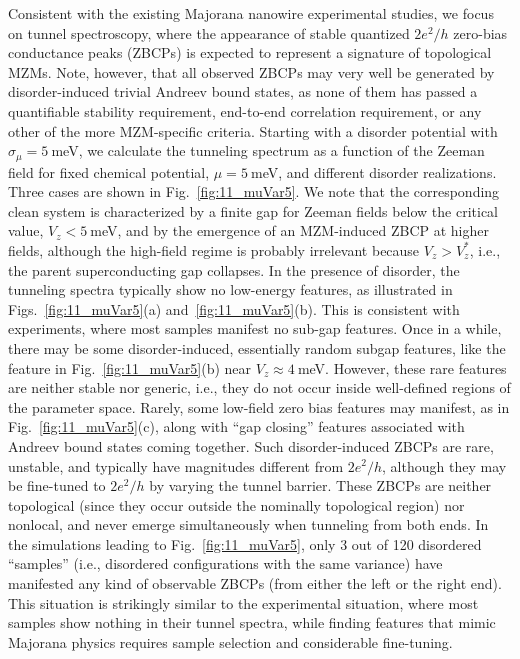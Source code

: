 \documentclass[aps,prmaterials,twocolumn,superscriptaddress,longbibliography]{revtex4-2}
\begin{document}
Consistent with the existing Majorana nanowire experimental studies, we focus on tunnel spectroscopy, where the appearance of stable quantized $ 2e^2/h $ zero-bias conductance peaks (ZBCPs) is expected to represent a signature of topological MZMs. Note, however, that all observed ZBCPs may very well be generated by disorder-induced trivial Andreev bound states, as none of them has passed a quantifiable stability requirement, end-to-end correlation requirement, or any other of the more MZM-specific criteria. 
Starting with a disorder potential with $\sigma_\mu = 5~$meV, we calculate the tunneling spectrum as a function of the Zeeman field for fixed chemical potential, $\mu=5~$meV, and different disorder realizations. Three cases are shown in Fig.~\ref{fig:11_muVar5}. We note that the corresponding clean system is characterized by a finite gap for Zeeman fields below the critical value, $V_z < 5~$meV, and by the emergence of an MZM-induced ZBCP at higher fields, although the high-field regime is probably irrelevant because $V_z > V_z^*$, i.e., the parent superconducting gap collapses.  
In the presence of disorder, the tunneling spectra typically show no low-energy features, as illustrated in  Figs.~\ref{fig:11_muVar5}(a) and~\ref{fig:11_muVar5}(b). This is consistent with experiments, where most samples manifest no sub-gap features.  Once in a while, there may be some disorder-induced, essentially random subgap features, like the feature in Fig.~\ref{fig:11_muVar5}(b) near $V_z\approx 4~$meV. However, these rare features are neither stable nor generic, i.e., they do not occur inside well-defined regions of the parameter space.
Rarely, some low-field zero bias features may manifest, as in Fig.~\ref{fig:11_muVar5}(c), along with ``gap closing'' features associated with Andreev bound states coming together. Such disorder-induced ZBCPs are rare, unstable, and typically have magnitudes different from $ 2e^2/h $,  although they may be fine-tuned to $2e^2/h $  by varying the tunnel barrier.  These ZBCPs are neither topological (since they occur outside the nominally topological region) nor nonlocal, and never emerge simultaneously when tunneling from both ends.  In the simulations leading to Fig.~\ref{fig:11_muVar5}, only 3 out of 120 disordered ``samples'' (i.e., disordered configurations with the same variance) have manifested any kind of observable ZBCPs (from either the left or the right end). This situation is strikingly similar to the experimental situation, where most samples show nothing in their tunnel spectra, while finding features that mimic Majorana physics requires sample selection and considerable fine-tuning. 
\end{document}
